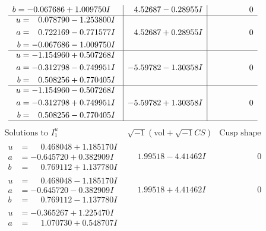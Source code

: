 \documentclass[1p]{elsarticle_modified}
\theoremstyle{definition}
\newcommand{\I}{\sqrt{-1}}
\begin{document}
$$\begin{array}{c|c|c}
\begin{aligned}
b &= -0.067686 + 1.009750 I\end{aligned}
 & \phantom{-}4.52687 - 0.28955 I & \phantom{-0.000000 } 0 \\ \hline\begin{aligned}
u &= \phantom{-}0.078790 - 1.253800 I \\
a &= \phantom{-}0.722169 - 0.771577 I \\
b &= -0.067686 - 1.009750 I\end{aligned}
 & \phantom{-}4.52687 + 0.28955 I & \phantom{-0.000000 } 0 \\ \hline\begin{aligned}
u &= -1.154960 + 0.507268 I \\
a &= -0.312798 - 0.749951 I \\
b &= \phantom{-}0.508256 + 0.770405 I\end{aligned}
 & -5.59782 - 1.30358 I & \phantom{-0.000000 } 0 \\ \hline\begin{aligned}
u &= -1.154960 - 0.507268 I \\
a &= -0.312798 + 0.749951 I \\
b &= \phantom{-}0.508256 - 0.770405 I\end{aligned}
 & -5.59782 + 1.30358 I & \phantom{-0.000000 } 0\\
 \hline 
 \end{array}$$\newpage$$\begin{array}{c|c|c}  
\text{Solutions to }I^u_{1}& \I (\text{vol} + \sqrt{-1}CS) & \text{Cusp shape}\\
 \hline 
\begin{aligned}
u &= \phantom{-}0.468048 + 1.185170 I \\
a &= -0.645720 + 0.382909 I \\
b &= \phantom{-}0.769112 + 1.137780 I\end{aligned}
 & \phantom{-}1.99518 - 4.41462 I & \phantom{-0.000000 } 0 \\ \hline\begin{aligned}
u &= \phantom{-}0.468048 - 1.185170 I \\
a &= -0.645720 - 0.382909 I \\
b &= \phantom{-}0.769112 - 1.137780 I\end{aligned}
 & \phantom{-}1.99518 + 4.41462 I & \phantom{-0.000000 } 0 \\ \hline\begin{aligned}
u &= -0.365267 + 1.225470 I \\
a &= \phantom{-}1.070730 + 0.548707 I \\

\end{aligned}
\end{array}$$
\end{document}
